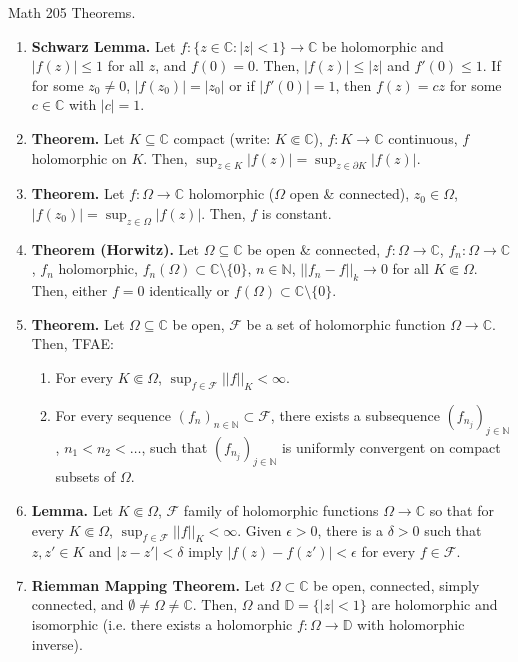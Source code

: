 \documentclass[12pt]{article}
\theoremstyle{definition}
\theoremstyle{named}
\begin{document}
\begin{center}
    Math 205 Theorems. 
\end{center}

\begin{enumerate}
    \item \textbf{Schwarz Lemma. } Let $f: \{z \in \mathbb{C}: |z| < 1\} \to \mathbb{C}$ be holomorphic and $|f(z)| \leq 1$ for all $z$, and $f(0)=0$. Then, $|f(z)| \leq |z|$ and $f'(0) \leq 1$. If for some $z_0 \neq 0$, $|f(z_0)| = |z_0|$ or if $|f'(0)| = 1$, then $f(z)=cz$ for some $c \in \mathbb{C}$ with $|c|=1$. 
    \item \textbf{Theorem. } Let $K \subseteq \mathbb{C}$ compact (write: $K \Subset \mathbb{C}$), $f: K \to \mathbb{C}$ continuous, $f$ holomorphic on $K$. Then, $\sup_{z \in K}|f(z)| = \sup_{z \in \partial K} |f(z)|$. 
    \item \textbf{Theorem. } Let $f: \Omega \to \mathbb{C}$ holomorphic ($\Omega$ open \& connected), $z_0 \in \Omega$, $|f(z_0)| = \sup_{z \in \Omega} |f(z)|$. Then, $f$ is constant. 
    \item \textbf{Theorem (Horwitz). } Let $\Omega \subseteq \mathbb{C}$ be open \& connected, $f: \Omega \to \mathbb{C}$, $f_n: \Omega \to \mathbb{C}$, $f_n$ holomorphic, $f_n(\Omega) \subset \mathbb{C} \setminus \{0\}$, $n \in \mathbb{N}$, $||f_n-f||_k \to 0$ for all $K \Subset \Omega$. Then, either $f=0$ identically or $f(\Omega) \subset \mathbb{C} \setminus \{0\}$. 
    \item \textbf{Theorem. } Let $\Omega \subseteq \mathbb{C}$ be open, $\mathscr{F}$ be a set of holomorphic function $\Omega \to \mathbb{C}$. Then, TFAE: 
    \begin{enumerate}
        \item For every $K \Subset \Omega$, $\sup_{f \in \mathscr{F}}||f||_K < \infty$. 
        \item For every sequence $(f_n)_{n \in \mathbb{N}} \subset \mathscr{F}$, there exists a subsequence $(f_{n_j})_{j \in \mathbb{N}}$, $n_1 < n_2 < \dots$, such that $(f_{n_j})_{j \in \mathbb{N}}$ is uniformly convergent on compact subsets of $\Omega$. 
    \end{enumerate}
    \item \textbf{Lemma. } Let $K \Subset \Omega$, $\mathscr{F}$ family of holomorphic functions $\Omega \to \mathbb{C}$ so that for every $K \Subset \Omega$, $\sup_{f \in \mathscr{F}} ||f||_K < \infty$. Given $\epsilon > 0$, there is a $\delta > 0$ such that $z,z'\in K$ and $|z-z'| < \delta$ imply $|f(z)-f(z')| < \epsilon$ for every $f \in \mathscr{F}$.
	\item \textbf{Riemman Mapping Theorem. } Let $\Omega \subset \mathbb{C}$ be open, connected, simply connected, and $\emptyset \neq \Omega \neq \mathbb{C}$. Then, $\Omega$ and $\mathbb{D} = \{|z| < 1\}$ are holomorphic and isomorphic (i.e. there exists a holomorphic $f: \Omega \to \mathbb{D}$ with holomorphic inverse).  
\end{enumerate}  
 
\end{document}
